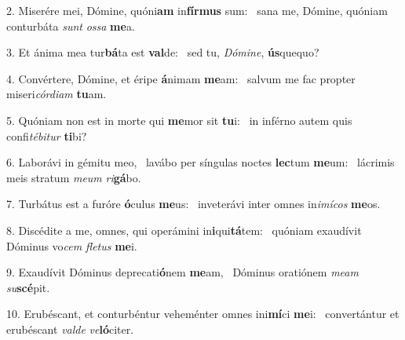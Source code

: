 2. Miserére mei, Dómine, quóni\textbf{am} in\textbf{fír}\textbf{mus} sum: \ast\  sana me, Dómine, quóniam conturbáta \textit{sunt} \textit{os}\textit{sa} \textbf{me}a.\

3. Et ánima mea tur\textbf{bá}ta est \textbf{val}de: \ast\  sed tu, \textit{Dó}\textit{mi}\textit{ne}, \textbf{ús}quequo?\

4. Convértere, Dómine, et éripe \textbf{á}nimam \textbf{me}am: \ast\  salvum me fac propter miseri\textit{cór}\textit{di}\textit{am} \textbf{tu}am.\

5. Quóniam non est in morte qui \textbf{me}mor sit \textbf{tu}i: \ast\  in inférno autem quis confi\textit{té}\textit{bi}\textit{tur} \textbf{ti}bi?\

6. Laborávi in gémitu meo, \dag\  lavábo per síngulas noctes \textbf{lec}tum \textbf{me}um: \ast\  lácrimis meis stratum \textit{me}\textit{um} \textit{ri}\textbf{gá}bo.\

7. Turbátus est a furóre \textbf{ó}culus \textbf{me}us: \ast\  inveterávi inter omnes in\textit{i}\textit{mí}\textit{cos} \textbf{me}os.\

8. Discédite a me, omnes, qui operámini in\textbf{i}qui\textbf{tá}tem: \ast\  quóniam exaudívit Dóminus vo\textit{cem} \textit{fle}\textit{tus} \textbf{me}i.\

9. Exaudívit Dóminus deprecati\textbf{ó}nem \textbf{me}am, \ast\  Dóminus oratiónem \textit{me}\textit{am} \textit{su}\textbf{scé}pit.\

10. Erubéscant, et conturbéntur veheménter omnes ini\textbf{mí}ci \textbf{me}i: \ast\  convertántur et erubéscant \textit{val}\textit{de} \textit{ve}\textbf{ló}citer.\


